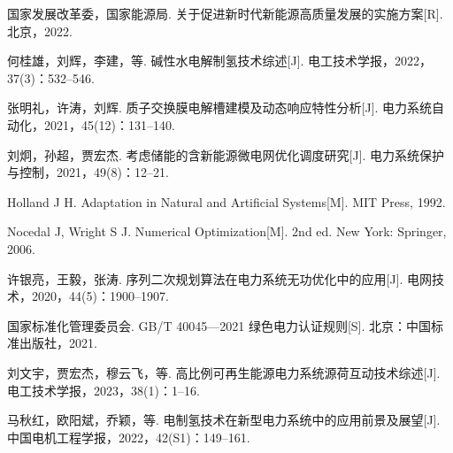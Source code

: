 \documentclass[UTF8,12pt,a4paper]{ctexart}
\begin{document}
\begin{enumerate}[label={[\arabic*]}, leftmargin=3em, itemsep=0.2em]
  \item 国家发展改革委，国家能源局. 关于促进新时代新能源高质量发展的实施方案[R]. 北京，2022.
  \item 何桂雄，刘辉，李建，等. 碱性水电解制氢技术综述[J]. 电工技术学报，2022，37(3)：532--546.
  \item 张明礼，许涛，刘辉. 质子交换膜电解槽建模及动态响应特性分析[J]. 电力系统自动化，2021，45(12)：131--140.
  \item 刘炯，孙超，贾宏杰. 考虑储能的含新能源微电网优化调度研究[J]. 电力系统保护与控制，2021，49(8)：12--21.
  \item Holland J H. Adaptation in Natural and Artificial Systems[M]. MIT Press, 1992.
  \item Nocedal J, Wright S J. Numerical Optimization[M]. 2nd ed. New York: Springer, 2006.
  \item 许银亮，王毅，张涛. 序列二次规划算法在电力系统无功优化中的应用[J]. 电网技术，2020，44(5)：1900--1907.
  \item 国家标准化管理委员会. GB/T 40045—2021 绿色电力认证规则[S]. 北京：中国标准出版社，2021.
  \item 刘文宇，贾宏杰，穆云飞，等. 高比例可再生能源电力系统源荷互动技术综述[J]. 电工技术学报，2023，38(1)：1--16.
  \item 马秋红，欧阳斌，乔颖，等. 电制氢技术在新型电力系统中的应用前景及展望[J]. 中国电机工程学报，2022，42(S1)：149--161.
\end{enumerate}
\end{document}
